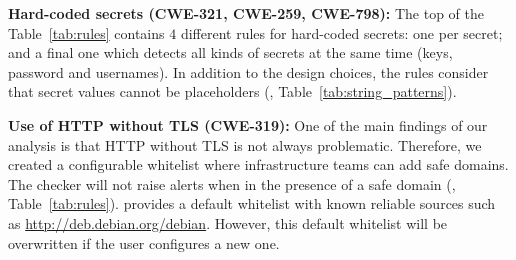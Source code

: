 \textbf{Hard-coded secrets (CWE-321, CWE-259, CWE-798):} The top of the Table~\ref{tab:rules}
contains $4$ different rules for hard-coded secrets: one per secret;
and a final one which detects all kinds of secrets at the same time (keys, 
password and usernames). In addition to the design choices,  
the rules consider that secret values cannot be placeholders 
(, Table~\ref{tab:string_patterns}).

\textbf{Use of HTTP without TLS (CWE-319):} One of the main findings 
of our analysis is that HTTP without TLS is not always problematic. Therefore,
we created a configurable whitelist where infrastructure teams can add
safe domains. The checker will not raise alerts when in the 
presence of a safe domain (, Table~\ref{tab:rules}). \toolname{} provides a default whitelist with 
known reliable sources such as \url{http://deb.debian.org/debian}. 
However, this default whitelist will be overwritten if the user 
configures a new one.



